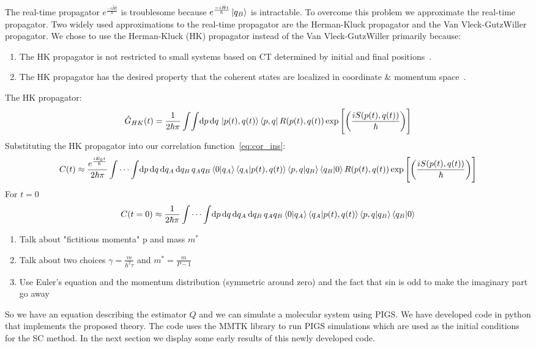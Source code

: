 \documentclass[12pt,letterpaper,oneside,final,titlepage]{article}               %
\numberwithin{equation}{section} %
\newcommand{\emiHt}{e^{\frac{-i\hat{H}t}{\hbar}}}
\newcommand{\expb}[1]{\ensuremath{\exp{\left[ #1 \right]}}}
\begin{document}
The real-time propagator $\emiHt$ is troublesome because $\emiHt\ket{q_{B}}$ is intractable. 
To overcome this problem we approximate the real-time propagator.
Two widely used approximations to the real-time propagator are the Herman-Kluck propagator and the Van Vleck-GutzWiller propagator.
We chose to use the Herman-Kluck (HK) propagator instead of the Van Vleck-GutzWiller primarily because:
\begin{enumerate}
    \item The HK propagator is not restricted to small systems based on CT determined by initial and final positions~\cite{kay2006herman}.
    \item The HK propagator has the desired property that the coherent states are localized in coordinate $\&$ momentum space~\cite{kay2006herman}.
\end{enumerate}
The HK propagator:
\begin{equation}\label{eq:HKprop}
    \hat{G}_{HK}(t) = \frac{1}{2\hbar\pi}\int\!\int \!\dif p\,\!\dif q\, 
    \ket{p(t), q(t)}\bra{p,q} R(p(t),q(t))
    \expb{\left(\frac{iS(p(t),q(t))}{\hbar}\right)}
\end{equation}
Substituting the HK propagator into our correlation function~\eqref{eq:cor_ins}:
\begin{equation*}
    C(t) \approx \frac{e^{\frac{iE_{0}t}{\hbar}}}{2\hbar\pi}\int\cdots\int\! \dif p\,\!\dif q\,\!\dif q_{A}\,\!\dif q_{B}\,
    q_{A}q_{B}\braket{0|q_{A}}\braket{q_{A}|p(t), q(t)} \braket{p,q|q_{B}}\braket{q_{B}|0}
    R(p(t),q(t)) \expb{\left(\frac{iS(p(t),q(t))}{\hbar}\right)}
\end{equation*}
For $t=0$
\begin{equation*}
    C(t=0) \approx \frac{1}{2\hbar\pi}\int\cdots\int\! \dif p\,\!\dif q\,\!\dif q_{A}\,\!\dif q_{B}\,
    q_{A}q_{B}\braket{0|q_{A}}\braket{q_{A}|p(t), q(t)} \braket{p,q|q_{B}}\braket{q_{B}|0}
\end{equation*}
\begin{enumerate}
    \item Talk about "fictitious momenta" p and mass $m^{*}$
    \item Talk about two choices $\gamma = \frac{m}{\hbar^{2}\tau}$ and $m^{*} = \frac{m}{P-1}$
    \item Use Euler's equation and the momentum distribution (symmetric around zero) and the fact that sin is odd to make the imaginary part go away
\end{enumerate}


So we have an equation describing the estimator $Q$ and we can simulate a molecular system using PIGS. We have developed code in python that implements the proposed theory. The code uses the MMTK library to run PIGS simulations which are used as the initial conditions for the SC method. In the next section we display some early results of this newly developed code.
\end{document}
